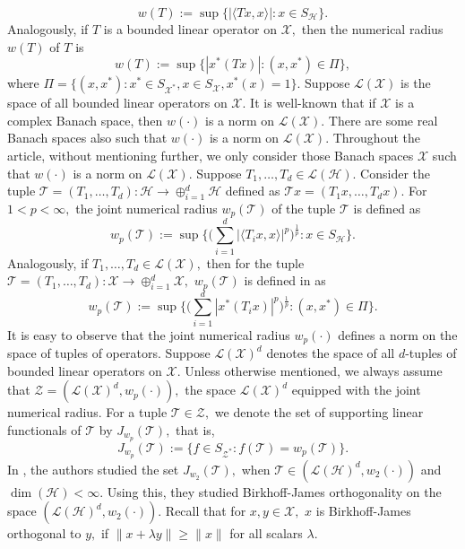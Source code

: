 \documentclass{amsart}
\theoremstyle{definition}
\theoremstyle{remark}
\numberwithin{equation}{section}
\begin{document}
\[w(T):=\sup\{|\langle Tx,x\rangle|:x\in S_\mathcal{H}\}.\]
Analogously, if $T$ is a bounded linear operator on $\mathcal{X},$ then the numerical radius $w(T)$ of $T$ is 
\[w(T):=\sup\{|x^*(Tx)|:(x,x^*)\in \Pi \},\]
 where $\Pi=\{(x,x^*):x^*\in S_{\mathcal{X}^*},x\in S_\mathcal{X},x^*(x)=1\}.$ Suppose $\mathcal{L}(\mathcal{X})$ is the space of all bounded linear operators on $\mathcal{X}.$ It is well-known that if $\mathcal{X}$ is a complex Banach space, then $w(\cdot)$ is a norm on $\mathcal{L}(\mathcal{X}).$ There are some real Banach spaces also such that $w(\cdot)$ is a norm on $\mathcal{L}(\mathcal{X}).$ Throughout the article, without mentioning further, we only consider those Banach spaces $\mathcal{X}$ such that $w(\cdot)$ is a norm on $\mathcal{L}(\mathcal{X}).$ Suppose $T_1,\ldots,T_d\in \mathcal{L}(\mathcal{H}).$ Consider the tuple $\mathcal{T}=(T_1,\ldots,T_d):\mathcal{H}\to \oplus_{i=1}^d\mathcal{H}$ defined as $\mathcal{T}x=(T_1x,\ldots,T_dx).$ For $1<p<\infty,$ the joint numerical radius $w_p(\mathcal{T})$ of the tuple $\mathcal{T}$ is defined as 
 \[w_p(\mathcal{T}):=\sup\bigg\{\Big(\sum_{i=1}^d|\langle T_ix,x\rangle|^p\Big)^\frac{1}{p}:x\in S_{\mathcal{H}}\bigg\}.\]
 Analogously, if $T_1,\ldots,T_d\in \mathcal{L}(\mathcal{X}),$ then for the tuple $\mathcal{T}=(T_1,\ldots,T_d):\mathcal{X}\to \oplus_{i=1}^d\mathcal{X},$ %
 $w_p(\mathcal{T})$ is defined in \cite{M} as
 \[w_p(\mathcal{T}):=\sup\bigg\{\Big(\sum_{i=1}^d|x^*( T_ix)|^p\Big)^\frac{1}{p}:(x,x^*)\in \Pi\bigg\}.\]
 It is easy to observe that the joint numerical radius $w_p(\cdot)$ defines a norm on the space of tuples of operators. Suppose $\mathcal{L}(\mathcal{X})^d$ denotes the space of all $d$-tuples of bounded linear operators on $\mathcal{X}.$ Unless otherwise mentioned, we always assume that $\mathcal{Z}=(\mathcal{L}(\mathcal{X})^d,w_p(\cdot)),$ the space $\mathcal{L}(\mathcal{X})^d$ equipped with the joint numerical radius. For a tuple $\mathcal{T}\in \mathcal{Z},$ we denote the set of supporting linear functionals of $\mathcal{T}$ by $J_{w_p}(\mathcal{T}),$ that is,
 \[J_{w_p}(\mathcal{T}):=\{f\in S_{\mathcal{Z}^*}:f(\mathcal{T})=w_p(\mathcal{T})\}.\]
 In \cite{GS}, the authors studied the set $J_{w_2}(\mathcal{T}),$ when $\mathcal{T}\in (\mathcal{L}(\mathcal{H})^d,w_2(\cdot))$ and $\dim(\mathcal{H})<\infty.$ Using this, they studied Birkhoff-James orthogonality on the space $(\mathcal{L}(\mathcal{H})^d,w_2(\cdot)).$ Recall that for $x,y\in \mathcal{X},$ $x$ is Birkhoff-James orthogonal \cite{B,J} to $y,$ if $\|x+\lambda y\|\geq \|x\|$ for all scalars $\lambda.$ 
\end{document}
